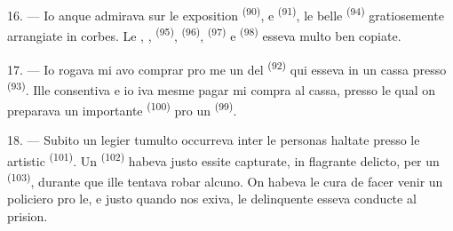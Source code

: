 16. --- Io anque admirava sur le exposition 
\textsuperscript{(90)}, e  \textsuperscript{(91)}, le
belle  \textsuperscript{(94)} gratiosemente arrangiate
in corbes. Le , , 
\textsuperscript{(95)},  \textsuperscript{(96)},
 \textsuperscript{(97)} e 
\textsuperscript{(98)} esseva multo ben copiate.

\VUsaut{4.4mm}
\VUsaut{2.8mm}

17. --- Io rogava mi avo comprar pro me un del 
\textsuperscript{(92)} qui esseva in un cassa presso  \textsuperscript{(93)}. Ille consentiva e io iva mesme pagar mi compra
al cassa, presso le qual on preparava un importante 
\textsuperscript{(100)} pro un  \textsuperscript{(99)}.

18. --- Subito un legier tumulto occurreva inter le personas haltate presso le
 artistic \textsuperscript{(101)}. Un 
\textsuperscript{(102)} habeva justo essite capturate, in flagrante delicto, per
un  \textsuperscript{(103)}, durante que ille tentava robar
alcuno. On habeva le cura de facer venir un policiero pro  le, e
justo quando nos exiva, le delinquente esseva conducte al prision.
\VUsaut{6.0mm}
\VUfilet{22mm}
